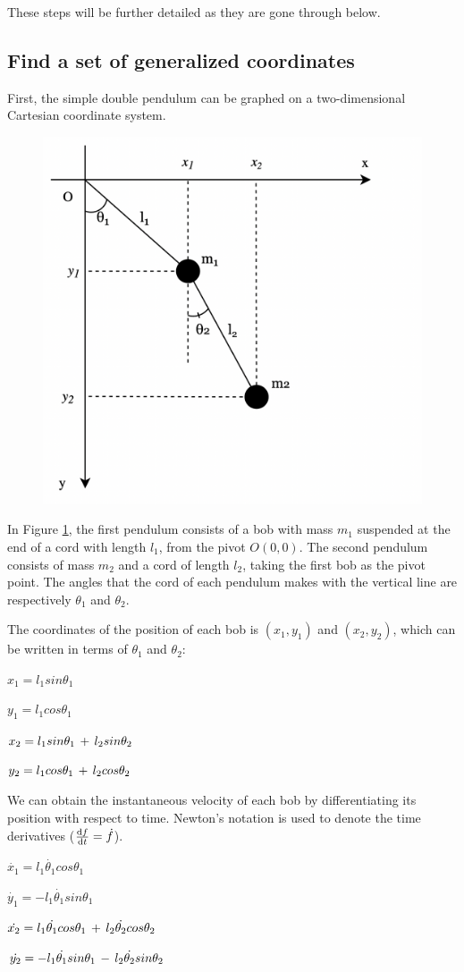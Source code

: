 \documentclass[a4paper,12pt]{article}
\begin{document}
These steps will be further detailed as they are gone through below.
\subsection{Find a set of generalized coordinates}
\raggedright{First, the simple double pendulum can be graphed on a two-dimensional Cartesian coordinate system.}
\begin{figure}[H]
    \begin{center}
        \includegraphics[width=.45\textwidth]{simpledbp} 
    \end{center}
    \caption{}
    \label{fig:simpledbp}
  \end{figure}

In Figure \ref{fig:simpledbp}, the first pendulum consists of a bob with mass $m_1$ suspended at the end of a 
cord with length $l_1$, from the pivot $O(0, 0)$. The second pendulum consists of mass $m_2$ and a cord of length $l_2$, taking the first bob as the pivot point. The angles that the cord of each pendulum makes with the vertical line are respectively $\theta_1$ and $\theta_2$.

\pagebreak The coordinates of the position of each bob is $(x_1,y_1)$ and $(x_2,y_2)$, which can be written in terms of $\theta_1$ and $\theta_2$:

\begin{center}
    $x_1 = l_1sin\theta_1$ 
    
    $y_1=l_1cos\theta_1$
   
    $x_2 = l_1sin\theta_1 \thinspace+\thinspace l_2sin\theta_2$ 
    
    $y_2=l_1cos\theta_1 \thinspace +\thinspace l_2cos\theta_2$ 
\end{center}

We can obtain the instantaneous velocity of each bob by differentiating its position with respect to time. Newton's notation is used to denote the time derivatives ($\dv{f}{t} = \dot{f}$). 
\begin{center}
    $\dot{x_1} = l_1\dot{\theta_1}cos\theta_1$ 
    
    $\dot{y_1}=-l_1\dot{\theta_1}sin\theta_1$
   
    $\dot{x_2} = l_1\dot{\theta_1}cos\theta_1 \thinspace+\thinspace l_2\dot{\theta_2}cos\theta_2$ 
    
    $\dot{y_2}=-l_1\dot{\theta_1}sin\theta_1 \thinspace -\thinspace l_2\dot{\theta_2}sin\theta_2$ 
\end{center}
\end{document}
